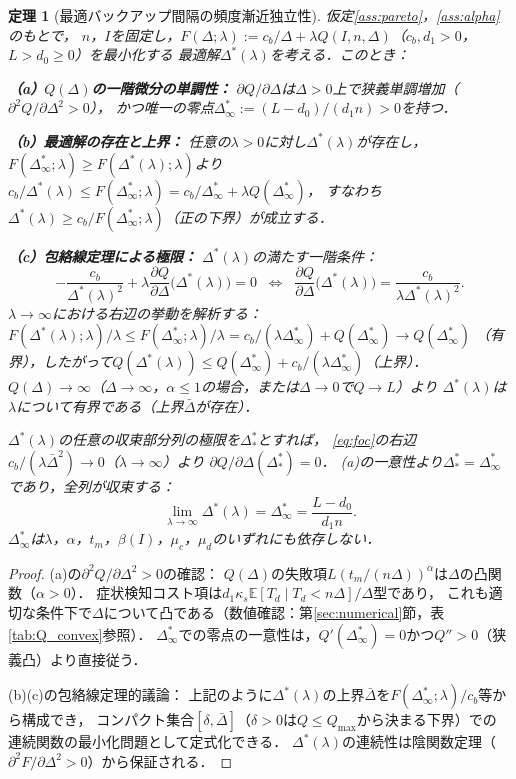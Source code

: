 \documentclass[12pt,a4paper]{article}
\theoremstyle{plain}
\newtheorem{theorem}{定理}[section]
\theoremstyle{definition}
\theoremstyle{remark}
\newcommand{\E}{\mathbb{E}}
\newcommand{\betaI}{\beta(I)}
\newcommand{\Dopt}{\Delta^{*}}
\newcommand{\Dinf}{\Delta^{*}_{\infty}}
\begin{document}
\begin{theorem}[最適バックアップ間隔の頻度漸近独立性]\label{thm:delta_inf}
仮定\ref{ass:pareto}，\ref{ass:alpha}のもとで，
$n$，$I$を固定し，$F(\Delta;\lambda):=c_b/\Delta+\lambda Q(I,n,\Delta)$（$c_b,d_1>0$，$L>d_0\ge0$）を最小化する
最適解$\Dopt(\lambda)$を考える．このとき：

\noindent\textbf{（a）$Q(\Delta)$の一階微分の単調性：}
$\partial Q/\partial\Delta$は$\Delta>0$上で狭義単調増加（$\partial^2 Q/\partial\Delta^2>0$），
かつ唯一の零点$\Dinf:=(L-d_0)/(d_1 n)>0$を持つ．

\noindent\textbf{（b）最適解の存在と上界：}
任意の$\lambda>0$に対し$\Dopt(\lambda)$が存在し，
$F(\Dinf;\lambda)\ge F(\Dopt(\lambda);\lambda)$より
$c_b/\Dopt(\lambda)\le F(\Dinf;\lambda)=c_b/\Dinf+\lambda Q(\Dinf)$，
すなわち$\Dopt(\lambda)\ge c_b/F(\Dinf;\lambda)$（正の下界）が成立する．

\noindent\textbf{（c）包絡線定理による極限：}
$\Dopt(\lambda)$の満たす一階条件：
\begin{equation}\label{eq:foc}
  -\frac{c_b}{\Dopt(\lambda)^2} + \lambda\frac{\partial Q}{\partial\Delta}\!\bigl(\Dopt(\lambda)\bigr) = 0
  \;\;\Leftrightarrow\;\;
  \frac{\partial Q}{\partial\Delta}\!\bigl(\Dopt(\lambda)\bigr) = \frac{c_b}{\lambda\Dopt(\lambda)^2}.
\end{equation}
$\lambda\to\infty$における右辺の挙動を解析する：
$F(\Dopt(\lambda);\lambda)/\lambda\le F(\Dinf;\lambda)/\lambda=c_b/(\lambda\Dinf)+Q(\Dinf)\to Q(\Dinf)$
（有界），したがって$Q(\Dopt(\lambda))\le Q(\Dinf)+c_b/(\lambda\Dinf)$（上界）．
$Q(\Delta)\to\infty$（$\Delta\to\infty$，$\alpha\le1$の場合，または$\Delta\to 0$で$Q\to L$）より
$\Dopt(\lambda)$は$\lambda$について有界である（上界$\bar\Delta$が存在）．

$\Dopt(\lambda)$の任意の収束部分列の極限を$\Dopt_*$とすれば，
\eqref{eq:foc}の右辺$c_b/(\lambda\bar\Delta^2)\to0$（$\lambda\to\infty$）より
$\partial Q/\partial\Delta(\Dopt_*)=0$．
(a)の一意性より$\Dopt_*=\Dinf$であり，全列が収束する：
\begin{equation}\label{eq:delta_inf}
\lim_{\lambda\to\infty}\Dopt(\lambda)=\Dinf=\frac{L-d_0}{d_1 n}.
\end{equation}
$\Dinf$は$\lambda$，$\alpha$，$t_m$，$\betaI$，$\mu_c$，$\mu_d$のいずれにも依存しない．
\end{theorem}

\begin{proof}
(a)の$\partial^2 Q/\partial\Delta^2>0$の確認：
$Q(\Delta)$の失敗項$L(t_m/(n\Delta))^\alpha$は$\Delta$の凸関数（$\alpha>0$）．
症状検知コスト項は$d_1\kappa_s\E[T_d\mid T_d<n\Delta]/\Delta$型であり，
これも適切な条件下で$\Delta$について凸である（数値確認：第\ref{sec:numerical}節，表\ref{tab:Q_convex}参照）．
$\Dinf$での零点の一意性は，$Q'(\Dinf)=0$かつ$Q''>0$（狭義凸）より直接従う．

(b)(c)の包絡線定理的議論：
上記のように$\Dopt(\lambda)$の上界$\bar\Delta$を$F(\Dinf;\lambda)/c_b$等から構成でき，
コンパクト集合$[\delta,\bar\Delta]$（$\delta>0$は$Q\le Q_{\max}$から決まる下界）での
連続関数の最小化問題として定式化できる．
$\Dopt(\lambda)$の連続性は陰関数定理（$\partial^2 F/\partial\Delta^2>0$）から保証される．
\end{proof}
\end{document}

